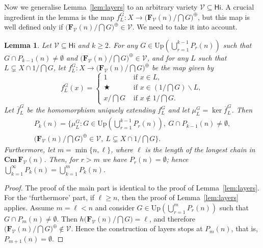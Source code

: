 \documentclass{amsart}
\newtheorem{lemma}[theorem]{Lemma}
\newcommand{\alg}[1]{\mathbf{#1}}
\newcommand{\var}[1]{\mathsf{#1}}
\newcommand{\ov}[1]{\overline{#1}}
\newcommand{\FV}{\alg{F}_\mathcal{V}}
\newcommand{\Cm}[1]{\mathbf{Cm}\, #1}
\def\op{\bigstar}
\begin{document}
Now we generalise Lemma~\ref{lem:layers} to an arbitrary variety
$\mathcal{V}\subseteq\var{Hi}$. A crucial ingredient in the lemma is
the map $f^G_L\colon X \to  \bigl(\FV(n)/\bigcap G\bigr)^\oplus$, but this map
is well defined only if $\bigl(\FV(n)/\bigcap G\bigr)^\oplus\in\mathcal{V}$.
We need to take it into account. 


\begin{lemma}\label{lem:layers-gen}
Let $\mathcal{V}\subseteq\var{Hi}$ and $k\geq 2$. For any
$G\in \mathrm{Up}\left(\bigcup_{r=1}^{k-1}P_r(n)\right)$ 
such that $G\cap P_{k-1}(n)\neq \emptyset$ and
$\bigl(\FV(n)/\bigcap G\bigr)^\oplus\in\mathcal{V}$,
and for any $L$ such that $L \subsetneq X\cap 1/\bigcap G$,
let $f^G_L\colon X \to  \bigl(\FV(n)/\bigcap G\bigr)^\oplus$ be the map
given by 
$$
f^G_L(x) =\begin{cases}
  1 & \text{ if } x\in L,\\
  \op & \text{ if } x\in \left(1/\bigcap G\right)\smallsetminus L,\\
  x/\bigcap G & \text{ if } x\notin 1/\bigcap G.
\end{cases} 
$$
Let $\ov{f}^G_L$ be the homomorphism uniquely extending $f^G_L$ and
let $\mu^G_L = \ker\ov{f}^G_L$. Then
\begin{multline*}
P_k(n) =
\biggl\{\mu^G_L: G\in \mathrm{Up}\left(\bigcup_{r=1}^{k-1}P_r(n)\right),\ 
G\cap P_{k-1}(n)\neq \emptyset, \\
\bigl(\FV(n)/\textstyle\bigcap G\bigr)^\oplus\in\mathcal{V}, \
L\subsetneq X\cap 1/\bigcap G  
\biggr\}.
\end{multline*}
Furthermore, let $m = \min\{n,\ell\}$, where $\ell$ is the length of the longest chain
in $\Cm{\FV(n)}$. Then, for $r>m$ we have $P_r(n) = \emptyset$; hence
$\bigcup_{k=1}^\infty P_k(n) = \bigcup_{k=1}^{m} P_k(n)$.
\end{lemma}  

\begin{proof}
The proof of the main part is identical to the proof of Lemma~\ref{lem:layers}.
For the `furthermore' part, if $\ell \geq n$, then the proof of 
Lemma~\ref{lem:layers} applies. Assume $m = \ell<n$ and consider
$G\in \mathrm{Up}\left(\bigcup_{r=1}^{m}P_r(n)\right)$ 
such that $G\cap P_{m}(n)\neq \emptyset$. Then
$h\bigl(\FV(n)/\bigcap G\bigr) = \ell$, and
therefore $\bigl(\FV(n)/\bigcap G\bigr)^\oplus\notin\mathcal{V}$.
Hence the construction of layers stops at $P_m(n)$, that is,
$P_{m+1}(n) = \emptyset$. 
\end{proof}
\end{document}
